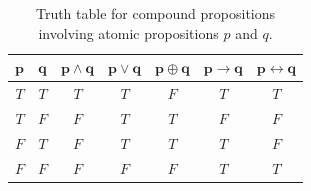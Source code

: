 \begin{table}[h]
    \centering
    \begin{tabular}{|c|c||c|c|c|c|c|}
        \hline $\mathbf{p}$ & $\mathbf{q}$ & $\mathbf{p \land q}$ & $\mathbf{p \lor q}$ & $\mathbf{p \oplus q}$ & $\mathbf{p \to q}$ & $\mathbf{p \longleftrightarrow q}$ \\
        \hline \cellcolor{green!25}$T$ & \cellcolor{green!25}$T$ & \cellcolor{green!25}$T$ & \cellcolor{green!25}$T$ & \cellcolor{red!25}$F$ & \cellcolor{green!25}$T$ & \cellcolor{green!25}$T$ \\
        \hline \cellcolor{green!25}$T$ & \cellcolor{red!25}$F$ & \cellcolor{red!25}$F$ & \cellcolor{green!25}$T$ & \cellcolor{green!25}$T$ & \cellcolor{red!25}$F$ & \cellcolor{red!25}$F$ \\
        \hline \cellcolor{red!25}$F$ & \cellcolor{green!25}$T$ & \cellcolor{red!25}$F$ & \cellcolor{green!25}$T$ & \cellcolor{green!25}$T$ & \cellcolor{green!25}$T$ & \cellcolor{red!25}$F$ \\
        \hline \cellcolor{red!25}$F$ & \cellcolor{red!25}$F$ & \cellcolor{red!25}$F$ & \cellcolor{red!25}$F$ & \cellcolor{red!25}$F$ & \cellcolor{green!25}$T$ & \cellcolor{green!25}$T$ \\
        \hline
    \end{tabular}
        \caption{Truth table for compound propositions involving atomic propositions $p$ and $q$.}
        \label{tab:comptab}
\end{table}